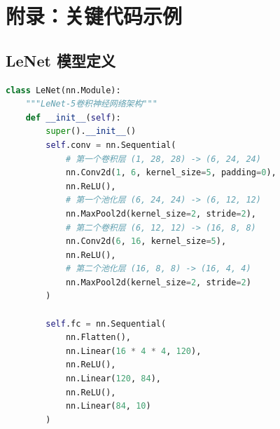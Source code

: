\documentclass[UTF8]{ctexart}
\begin{document}
\newpage
\section{附录：关键代码示例}
\subsection{LeNet 模型定义}
\begin{lstlisting}[language=Python]
class LeNet(nn.Module):
    """LeNet-5卷积神经网络架构"""
    def __init__(self):
        super().__init__()
        self.conv = nn.Sequential(
            # 第一个卷积层 (1, 28, 28) -> (6, 24, 24)
            nn.Conv2d(1, 6, kernel_size=5, padding=0),
            nn.ReLU(),
            # 第一个池化层 (6, 24, 24) -> (6, 12, 12)
            nn.MaxPool2d(kernel_size=2, stride=2),
            # 第二个卷积层 (6, 12, 12) -> (16, 8, 8)
            nn.Conv2d(6, 16, kernel_size=5),
            nn.ReLU(),
            # 第二个池化层 (16, 8, 8) -> (16, 4, 4)
            nn.MaxPool2d(kernel_size=2, stride=2)
        )
        
        self.fc = nn.Sequential(
            nn.Flatten(),
            nn.Linear(16 * 4 * 4, 120),
            nn.ReLU(),
            nn.Linear(120, 84),
            nn.ReLU(),
            nn.Linear(84, 10)
        )
\end{lstlisting}
\end{document}
